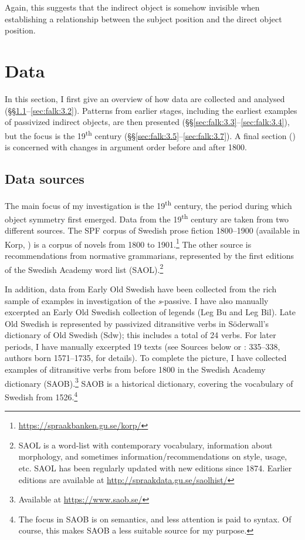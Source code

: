 \documentclass[output=paper]{langscibook}
\begin{document}
Again, this suggests that the indirect object is somehow invisible when establishing a relationship between the subject position and the direct object position.

\section{Data}\label{sec:falk:3}


In this section, I first give an overview of how data are collected and analysed (§§\ref{sec:falk:3.1}--\ref{sec:falk:3.2}). Patterns from earlier stages, including the earliest examples of passivized indirect objects, are then presented (§§\ref{sec:falk:3.3}--\ref{sec:falk:3.4}), but the focus is the 19\textsuperscript{th} century (§§\ref{sec:falk:3.5}--\ref{sec:falk:3.7}). A final section () is concerned with changes in argument order before and after 1800.

\subsection{Data sources}
\label{sec:falk:3.1}

The main focus of my investigation is the 19\textsuperscript{th} century, the period during which object symmetry first emerged. Data from the 19\textsuperscript{th} century are taken from two different sources. The SPF corpus of Swedish prose fiction 1800–1900 (available in Korp, \citealt{BorinEtAl2012}) is a corpus of novels from 1800 to 1901.\footnote{\url{https://spraakbanken.gu.se/korp/}}  The other source is recommendations from normative grammarians, represented by the first editions of the Swedish Academy word list (SAOL).\footnote{SAOL is a word-list with contemporary vocabulary, information about morphology, and sometimes information/recommendations on style, usage, etc. SAOL has been regularly updated with new editions since 1874. Earlier editions are available at \url{http://spraakdata.gu.se/saolhist/}{} }


In addition, data from Early Old Swedish have been collected from the rich sample of examples in  investigation of the \textit{s}{}-passive. I have also manually excerpted an Early Old Swedish collection of legends (Leg Bu and Leg Bil). Late Old Swedish is represented by passivized ditransitive verbs in Söderwall’s dictionary of Old Swedish (Sdw); this includes a total of 24 verbs. For later periods, I have manually excerpted 19 texts (see Sources below or \citealt{Falk1993}: 335–338, authors born 1571–1735, for details). To complete the picture, I have collected examples of ditransitive verbs from before 1800 in the Swedish Academy dictionary (SAOB).\footnote{Available at \url{https://www.saob.se/}}  SAOB is a historical dictionary, covering the vocabulary of Swedish from 1526.\footnote{The focus in SAOB is on semantics, and less attention is paid to syntax. Of course, this makes SAOB a less suitable source for my purpose.}
\end{document}
